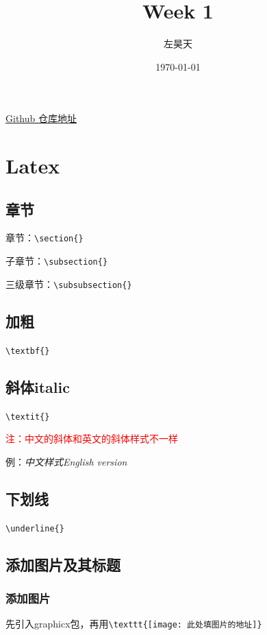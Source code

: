 \documentclass[UTF8]{ctexart}
\title{Week 1}
\author{左昊天}
\date{\today}
\begin{document}
\maketitle
\begin{center}
   \href{https://github.com/eric041224/tool_class_2024_sum}{Github 仓库地址}
\end{center}
\thispagestyle{empty}

\newpage
\section{Latex}
\setcounter{page}{1} %
\subsection{章节}
章节：\verb|\section{}|

子章节：\verb|\subsection{}|

三级章节：\verb|\subsubsection{}|

\subsection{加粗}\verb|\textbf{}|
\subsection{斜体italic}
\verb|\textit{}|  
 
\textcolor{red}{注：中文的斜体和英文的斜体样式不一样}

例：\textit{中文样式}\qquad\textit{English version}

\subsection{下划线}\verb|\underline{}|

\subsection{添加图片及其标题} 
\subsubsection{添加图片} 
先引入graphicx包，再用\verb|\texttt{[image: 此处填图片的地址]}| 
\end{document}
